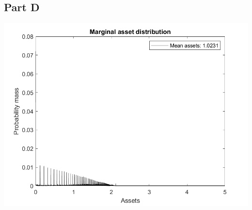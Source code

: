 \documentclass[11pt]{article} %
\begin{document}
\subsection{Part D}

\includegraphics{marginal}
\end{document}
